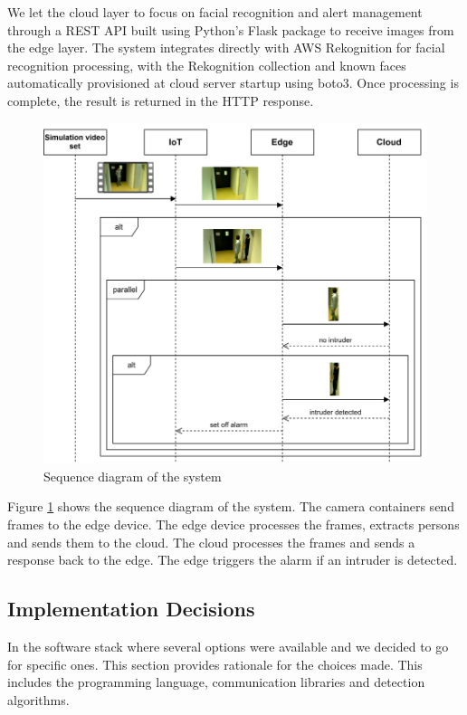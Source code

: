 \documentclass[conference]{IEEEtran}
\begin{document}
We let the cloud layer to focus on facial recognition and alert management through a REST API built using Python's Flask package to receive images from the edge layer. The system integrates directly with AWS Rekognition for facial recognition processing, with the Rekognition collection and known faces automatically provisioned at cloud server startup using boto3. Once processing is complete, the result is returned in the HTTP response.


\begin{figure}[!h]
    \includegraphics[width=1\linewidth]{./res/sequenz_diagram.png}
    \caption{Sequence diagram of the system}
    \label{fig:sequence_diagram}
\end{figure}

Figure \ref{fig:sequence_diagram} shows the sequence diagram of the system. The camera containers send frames to the edge device. The edge device processes the frames, extracts persons and sends them to the cloud. The cloud processes the frames and sends a response back to the edge. The edge triggers the alarm if an intruder is detected. 


\subsection{Implementation Decisions}
In the software stack where several options were available and we decided to go for specific ones. This section provides rationale for the choices made. This includes the programming language, communication libraries and detection algorithms.
\\
\end{document}
